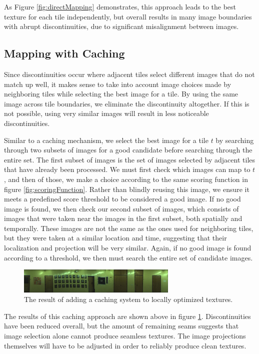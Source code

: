 \documentclass[10pt,twocolumn,letterpaper]{article}
\begin{document}
As Figure \ref{fig:directMapping} demonstrates, this approach leads to
the best texture for each tile independently, but overall results in
many image boundaries with abrupt discontinuities, due to significant
misalignment between images.

\subsection{Mapping with Caching}
Since discontinuities occur where adjacent tiles select different
images that do not match up well, it makes sense to take into account
image choices made by neighboring tiles while selecting the best image
for a tile. By using the same image across tile boundaries, we
eliminate the discontinuity altogether. If this is not possible, using
very similar images will result in less noticeable discontinuities.

Similar to a caching mechanism, we select the best image for a tile
$t$ by searching through two subsets of images for a good candidate
before searching through the entire set. The first subset of images is
the set of images selected by adjacent tiles that have already been
processed. We must first check which images can map to $t$, and then
of those, we make a choice according to the same scoring function in
figure \ref{fig:scoringFunction}. Rather than blindly reusing this
image, we ensure it meets a predefined score threshold to be
considered a good image. If no good image is found, we then check our
second subset of images, which consists of images that were taken near
the images in the first subset, both spatially and temporally. These
images are not the same as the ones used for neighboring tiles, but
they were taken at a similar location and time, suggesting that their
localization and projection will be very similar. Again, if no good
image is found according to a threshold, we then must search the
entire set of candidate images.

\begin{figure}
  \centering
  \includegraphics[width=3in]{wall1_cache_full.jpg}
  \caption{The result of adding a caching system to locally optimized textures.}
  \label{fig:caching}
\end{figure}


The results of this caching approach are shown above in figure
\ref{fig:caching}.  Discontinuities have been reduced overall, but the
amount of remaining seams suggests that image selection
alone cannot produce seamless textures. The image projections themselves will have to be adjusted in order to reliably produce clean textures.
\end{document}
